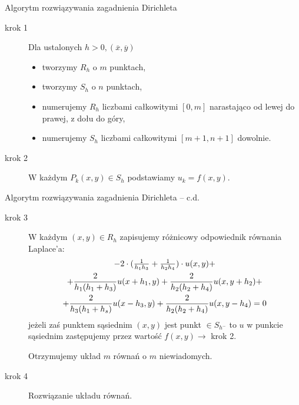 \begin{frame}
  \begin{block}{Algorytm rozwiązywania zagadnienia Dirichleta}
    \begin{description}
      \item[krok 1]
        Dla ustalonych $h>0, (\overline{x},\overline{y})$
        \begin{itemize}
          \item tworzymy $R_h$ o $m$ punktach,
          \item tworzymy $S_h$ o $n$ punktach,
          \item numerujemy $R_h$ liczbami całkowitymi $[0,m]$ narastająco od lewej do prawej, z dołu do góry,
          \item numerujemy $S_h$ liczbami całkowitymi $[m+1, n+1]$ dowolnie.
        \end{itemize}
      \item[krok 2]
        W każdym $P_k(x,y) \in S_h$ podstawiamy $u_k = f(x,y)$.
    \end{description}
  \end{block}
\end{frame}

\begin{frame}
  \begin{block}{Algorytm rozwiązywania zagadnienia Dirichleta -- c.d.}
    \begin{description}
      \item[krok 3]
        W każdym $(x,y) \in R_h$ zapisujemy różnicowy odpowiednik równania Laplace'a:
        \begin{multline*}
          $$-2 \cdot ( \frac{1}{h_1 h_3} + \frac{1}{h_2 h_4}) \cdot u(x,y) + \\
          + \frac{2}{h_1 (h_1 + h_3)} u(x+h_1,y) + \frac{2}{h_2 (h_2 + h_4)} u(x,y + h_2) + \\
          + \frac{2}{h_3 (h_1 + h_s)} u(x-h_3,y)+\frac{2}{h_2 (h_2 + h_4)} u(x,y - h_4)=0$$ %
        \end{multline*}
        jeżeli zaś punktem sąsiednim $(x,y)$ jest punkt $\in S_{h^-}$ %
        to $u$ w punkcie sąsiednim zastępujemy przez wartość $f(x,y) \rightarrow$ krok 2.

        Otrzymujemy układ $m$ równań o $m$ niewiadomych.
      \item[krok 4]
        Rozwiązanie układu równań.
    \end{description}
  \end{block}
\end{frame}

